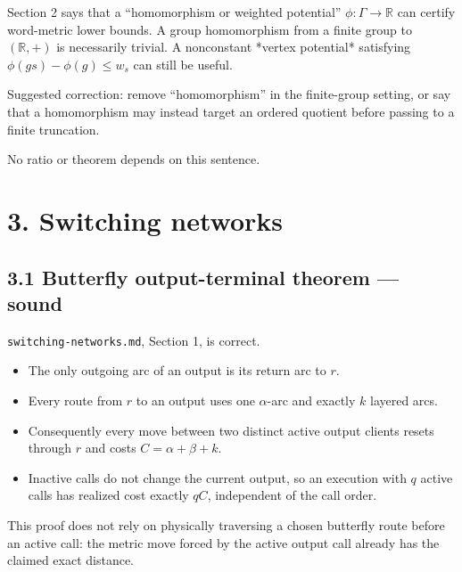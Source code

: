 \documentclass[11pt,a4paper]{article}
\begin{document}
Section 2 says that a “homomorphism or weighted potential” \(\phi:\Gamma\to\mathbb R\) can certify word-metric lower bounds.  A group homomorphism from a finite group to \((\mathbb R,+)\) is necessarily trivial. A nonconstant *vertex potential* satisfying \(\phi(gs)-\phi(g)\le w_s\) can still be useful.


Suggested correction: remove “homomorphism” in the finite-group setting, or say that a homomorphism may instead target an ordered quotient before passing to a finite truncation.


No ratio or theorem depends on this sentence.


\section*{3. Switching networks}

\subsection*{3.1 Butterfly output-terminal theorem — sound}

\nolinkurl{switching-networks.md}, Section 1, is correct.


\begin{itemize}

\item The only outgoing arc of an output is its return arc to \(r\).

\item Every route from \(r\) to an output uses one \(\alpha\)-arc and exactly \(k\) layered arcs.

\item Consequently every move between two distinct active output clients resets through \(r\) and costs \(C=\alpha+\beta+k\).

\item Inactive calls do not change the current output, so an execution with \(q\) active calls has realized cost exactly \(qC\), independent of the call order.

\end{itemize}

This proof does not rely on physically traversing a chosen butterfly route before an active call: the metric move forced by the active output call already has the claimed exact distance.
\end{document}
